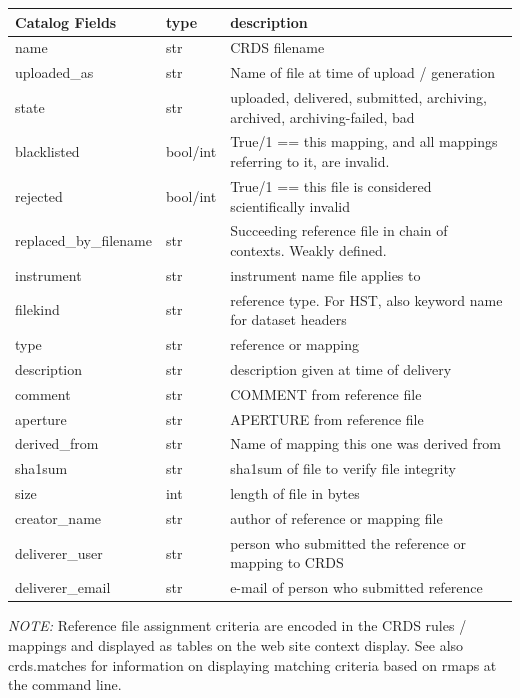 \documentclass[letterpaper,10pt,english]{sphinxmanual}
\begin{document}
\begin{tabulary}{\linewidth}{|L|L|L|}
\hline
\textsf{\relax 
Catalog Fields
} & \textsf{\relax 
type
} & \textsf{\relax 
description
}\\
\hline
name
 & 
str
 & 
CRDS filename
\\

uploaded\_as
 & 
str
 & 
Name of file at time of upload / generation
\\

state
 & 
str
 & 
uploaded, delivered, submitted, archiving, archived, archiving-failed, bad
\\

blacklisted
 & 
bool/int
 & 
True/1 == this mapping,  and all mappings referring to it, are invalid.
\\

rejected
 & 
bool/int
 & 
True/1 == this file is considered scientifically invalid
\\

replaced\_by\_filename
 & 
str
 & 
Succeeding reference file in chain of contexts.  Weakly defined.
\\

instrument
 & 
str
 & 
instrument name file applies to
\\

filekind
 & 
str
 & 
reference type. For HST,  also keyword name for dataset headers
\\

type
 & 
str
 & 
reference or mapping
\\

description
 & 
str
 & 
description given at time of delivery
\\

comment
 & 
str
 & 
COMMENT from reference file
\\

aperture
 & 
str
 & 
APERTURE from reference file
\\

derived\_from
 & 
str
 & 
Name of mapping this one was derived from
\\

sha1sum
 & 
str
 & 
sha1sum of file to verify file integrity
\\

size
 & 
int
 & 
length of file in bytes
\\

creator\_name
 & 
str
 & 
author of reference or mapping file
\\

deliverer\_user
 & 
str
 & 
person who submitted the reference or mapping to CRDS
\\

deliverer\_email
 & 
str
 & 
e-mail of person who submitted reference
\\
\hline\end{tabulary}


\emph{NOTE:} Reference file assignment criteria are encoded in the CRDS rules / mappings and displayed as tables on
the web site context display.   See also crds.matches for information on displaying matching criteria based on rmaps
at the command line.



\renewcommand{\indexname}{Index}
\printindex
\end{document}
